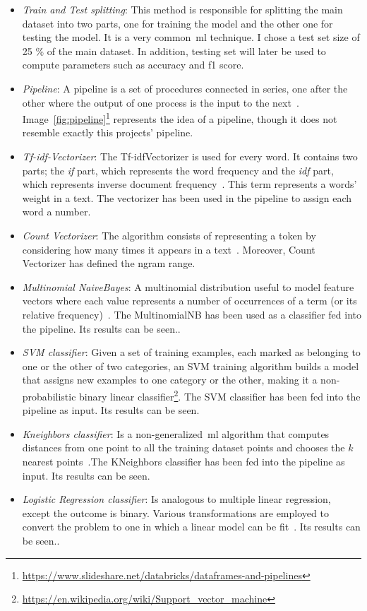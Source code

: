 \begin{itemize}
	\item \textit{Train and Test splitting}: This method is responsible for splitting the main dataset into two parts, one for training the model and the other one for testing the model. It is a very common~\ac{ml} technique. I chose a test set size of 25 \% of the main dataset. In addition, testing set will later be used to compute parameters such as accuracy and f1 score.
	\item \textit{Pipeline}: A pipeline is a set of procedures connected in series, one after the other where the output of one process is the input to the next~\cite{pipeline1}. Image~\ref{fig:pipeline}\footnote{\url{https://www.slideshare.net/databricks/dataframes-and-pipelines}} represents the idea of a pipeline, though it does not resemble exactly this projects' pipeline.
	\item \textit{Tf-idf-Vectorizer}: The Tf-idfVectorizer is used for every word. It contains two parts; the \textit{if} part, which represents the word frequency and the \textit{idf} part, which represents inverse document frequency~\cite{tfidf1}. This term represents a words' weight in a text. The vectorizer has been used in the pipeline to assign each word a number. 
	\item \textit{Count Vectorizer}: The algorithm consists of representing a token by considering how many times it appears in a text~\cite{countvect1}. Moreover, Count Vectorizer has defined the ngram range.
	\item \textit{Multinomial NaiveBayes}: A multinomial distribution useful to model feature vectors where each value represents a number of occurrences of a term (or its relative frequency)~\cite{countvect1}. The MultinomialNB has been used as a classifier fed into the pipeline. Its results can be seen..
	\item \textit{SVM classifier}: Given a set of training examples, each marked as belonging to one or the other of two categories, an SVM training algorithm builds a model that assigns new examples to one category or the other, making it a non-probabilistic binary linear classifier\footnote{\url{https://en.wikipedia.org/wiki/Support_vector_machine}}. The SVM classifier has been  fed into the pipeline as input. Its results can be seen.
	\item \textit{Kneighbors classifier}: Is a non-generalized~\ac{ml} algorithm that computes distances from one point to all the training dataset points and chooses the $k$ nearest points~\cite{knn1}.The KNeighbors classifier has been  fed into the pipeline as input. Its results can be seen.
	\item \textit{Logistic Regression classifier}: Is analogous to multiple linear regression, except the outcome is binary. Various transformations are employed to convert the problem to one in which a linear model can be fit~\cite{lr1}. Its results can be seen..
\end{itemize}

